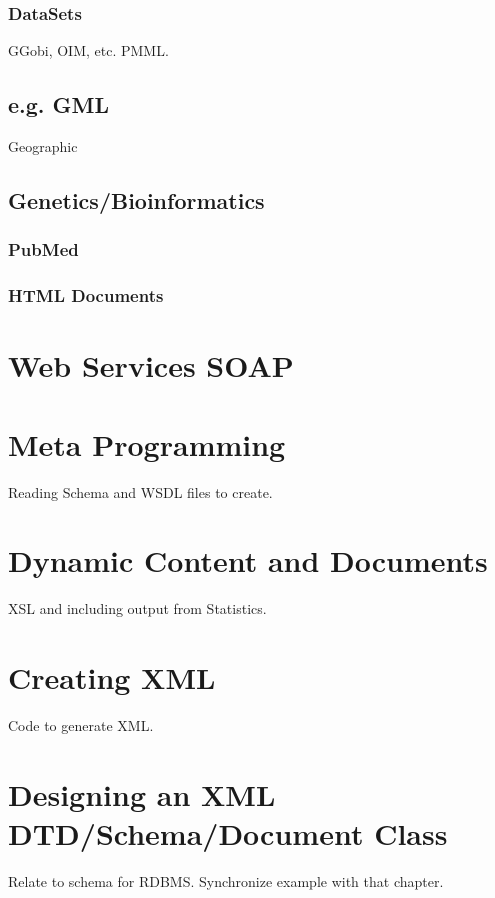 \subsubsection{DataSets}
 GGobi, OIM, etc.
PMML.

\subsection{e.g. GML}
Geographic

\subsection{Genetics/Bioinformatics}

\subsubsection{PubMed}
\subsubsection{HTML Documents}

\section{Web Services SOAP}

\section{Meta Programming}
Reading Schema and WSDL files
to create.



\section{Dynamic Content and Documents}
XSL and including output from Statistics.

\section{Creating XML}
Code to generate XML.

\section{Designing an XML DTD/Schema/Document Class}

Relate to schema for RDBMS. Synchronize example with that chapter.